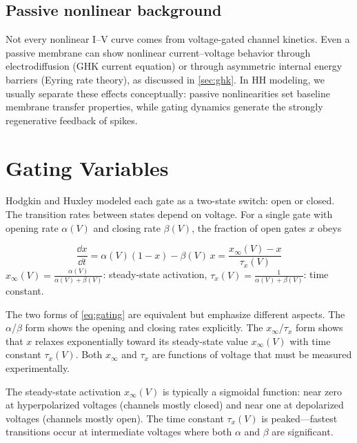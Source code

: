 \subsection{Passive nonlinear background}

Not every nonlinear I--V curve comes from voltage-gated channel kinetics. Even a passive membrane can show nonlinear current--voltage behavior through electrodiffusion (GHK current equation) or through asymmetric internal energy barriers (Eyring rate theory), as discussed in \cref{sec:ghk}. In HH modeling, we usually separate these effects conceptually: passive nonlinearities set baseline membrane transfer properties, while gating dynamics generate the strongly regenerative feedback of spikes.

\section{Gating Variables}
\label{sec:gating-variables}

Hodgkin and Huxley modeled each gate as a two-state switch: open or closed. The transition rates between states depend on voltage. For a single gate with opening rate $\alpha(V)$ and closing rate $\beta(V)$, the fraction of open gates $x$ obeys

\begin{keyequation}
\begin{equation}
  \frac{\dd x}{\dd t} = \alpha(V)(1 - x) - \beta(V)\,x = \frac{x_\infty(V) - x}{\tau_x(V)}
  \label{eq:gating}
\end{equation}
\tcblower
$x_\infty(V) = \displaystyle\frac{\alpha(V)}{\alpha(V) + \beta(V)}$: steady-state activation, \quad
$\tau_x(V) = \displaystyle\frac{1}{\alpha(V) + \beta(V)}$: time constant.
\end{keyequation}

\noindent The two forms of \cref{eq:gating} are equivalent but emphasize different aspects. The $\alpha$/$\beta$ form shows the opening and closing rates explicitly. The $x_\infty$/$\tau_x$ form shows that $x$ relaxes exponentially toward its steady-state value $x_\infty(V)$ with time constant $\tau_x(V)$. Both $x_\infty$ and $\tau_x$ are functions of voltage that must be measured experimentally.

The steady-state activation $x_\infty(V)$ is typically a sigmoidal function: near zero at hyperpolarized voltages (channels mostly closed) and near one at depolarized voltages (channels mostly open). The time constant $\tau_x(V)$ is peaked---fastest transitions occur at intermediate voltages where both $\alpha$ and $\beta$ are significant.

